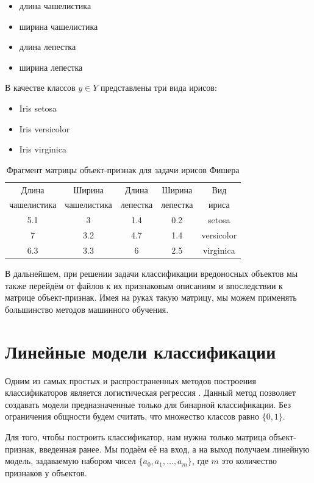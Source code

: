 \begin{itemize}
\item длина чашелистика
\item ширина чашелистика
\item длина лепестка
\item ширина лепестка
\end{itemize}

В качестве классов $y \in Y$ представлены три вида ирисов:
\begin{itemize}
\item Iris setosa
\item Iris versicolor
\item Iris virginica 
\end{itemize}


\begin{table}[ht]
\caption{Фрагмент матрицы объект-признак для задачи ирисов Фишера}
\label{tab_weight}
\centering
    \begin{tabular}{|c|c|c|c|c|}
    \hline Длина  & Ширина  & Длина  & Ширина  & Вид  \\
    чашелистика & чашелистика & лепестка & лепестка & ириса \\
    \hline 5.1 & 3 & 1.4 & 0.2 & setosa  \\
    \hline 7 & 3.2 & 4.7 & 1.4 & versicolor  \\
    \hline 6.3 & 3.3 & 6 & 2.5 & virginica  \\
    \hline
    \end{tabular}
\end{table}

В дальнейшем, при решении задачи классификации вредоносных объектов мы также перейдём от файлов к их признаковым описаниям и впоследствии к матрице объект-признак.
Имея на руках такую матрицу, мы можем применять большинство методов машинного обучения.

\section{Линейные модели классификации}

Одним из самых простых и распространенных методов построения классификаторов является логистическая регрессия \cite{log_reg}. 
Данный метод позволяет создавать модели предназначенные только для бинарной классификации.
Без ограничения общности будем считать, что множество классов равно $\{0, 1\}$.

Для того, чтобы построить классификатор, нам нужна только матрица объект-признак, введенная ранее. Мы подаём её на вход, а на выход получаем линейную модель, задаваемую набором чисел $\{a_0, a_1,…, a_m\}$, где $m$ это количество признаков у объектов. 

